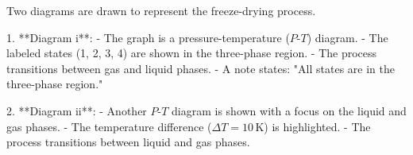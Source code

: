 Two diagrams are drawn to represent the freeze-drying process.  

1. **Diagram i**:  
   - The graph is a pressure-temperature (\(P\)-\(T\)) diagram.  
   - The labeled states (1, 2, 3, 4) are shown in the three-phase region.  
   - The process transitions between gas and liquid phases.  
   - A note states: "All states are in the three-phase region."  

2. **Diagram ii**:  
   - Another \(P\)-\(T\) diagram is shown with a focus on the liquid and gas phases.  
   - The temperature difference (\(\Delta T = 10 \, \text{K}\)) is highlighted.  
   - The process transitions between liquid and gas phases.